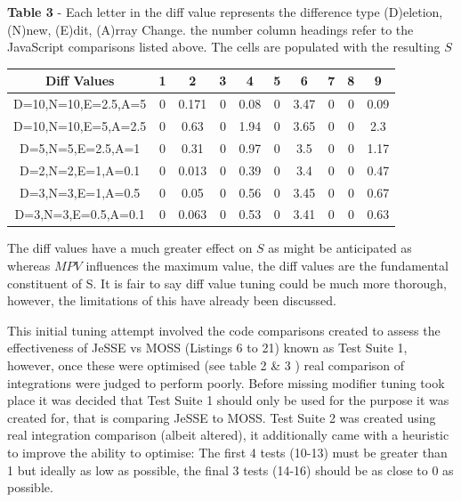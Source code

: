 \documentclass[jou,apacite]{apa6}
\begin{document}
\textbf{Table 3} - Each letter in the diff value represents the difference type (D)eletion, (N)new, (E)dit, (A)rray Change. the number column headings refer to the JavaScript comparisons listed above. The cells are populated with the resulting $S$


\setlength{\tabcolsep}{2pt}
\renewcommand{\arraystretch}{1.5}

\begin{center}
 \begin{tabular}{||c c c c c c c c c c||} 
 \hline
 Diff Values & 1 & 2 & 3 & 4 & 5 & 6 & 7 & 8 & 9 \\ [-0.2ex] 
 \hline\hline
 D=10,N=10,E=2.5,A=5  & 0 & 0.171 & 0 & 0.08 & 0 & 3.47 & 0 & 0 & 0.09 \\ 
 \hline
 D=10,N=10,E=5,A=2.5  & 0 & 0.63 & 0 & 1.94 & 0 & 3.65 & 0 & 0 & 2.3  \\
 \hline
 D=5,N=5,E=2.5,A=1 & 0 & 0.31 & 0 & 0.97 & 0 & 3.5 & 0 & 0 & 1.17  \\
 \hline
  D=2,N=2,E=1,A=0.1  & 0 & 0.013 & 0 & 0.39 & 0 & 3.4 & 0 & 0 & 0.47  \\
  \hline
    D=3,N=3,E=1,A=0.5 & 0 & 0.05 & 0 & 0.56 & 0 & 3.45 & 0 & 0 & 0.67  \\
  \hline
   D=3,N=3,E=0.5,A=0.1  & 0 & 0.063 & 0 & 0.53 & 0 & 3.41 & 0 & 0 & 0.63 \\ 
  \hline
\end{tabular}
\end{center}

The diff values have a much greater effect on $S$ as might be anticipated as whereas $MPV$ influences the maximum value, the diff values are the fundamental constituent of S. It is fair to say diff value tuning could be much more thorough, however, the limitations of this have already been discussed.

This initial tuning attempt involved the code comparisons created to assess the effectiveness of JeSSE vs MOSS (Listings 6 to 21) known as Test Suite 1, however, once these were optimised (see table 2 \& 3 ) real comparison of integrations were judged to perform poorly. Before missing modifier tuning took place it was decided that Test Suite 1 should only be used for the purpose it was created for, that is comparing JeSSE to MOSS. Test Suite 2 was created using real integration comparison (albeit altered), it additionally came with a heuristic to improve the ability to optimise: The first 4 tests (10-13) must be greater than 1 but ideally as low as possible, the final 3 tests (14-16) should be as close to 0 as possible.
\end{document}
